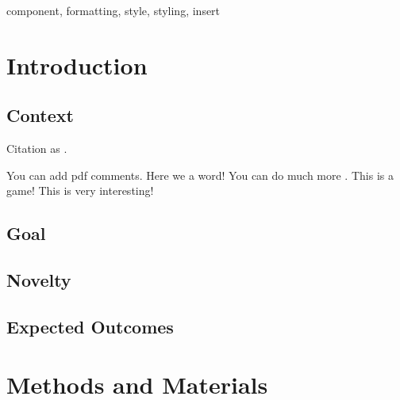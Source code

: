 \documentclass[conference]{IEEEtran}
\begin{document}
\begin{abstract}
\blindtext
\end{abstract}

\begin{IEEEkeywords}
component, formatting, style, styling, insert
\end{IEEEkeywords}




\section{Introduction}
\subsection{Context}
\par Citation as \cite{UserManual}.

\par You can add pdf comments. Here we a word!
You can do much more .
This is a   game!
This is very interesting!

\par \blindtext



\subsection{Goal}
\par \blindtext


\subsection{Novelty}
\par \blindtext



\subsection{Expected Outcomes}
\par \blindtext

 
\section{Methods and Materials}
\end{document}
